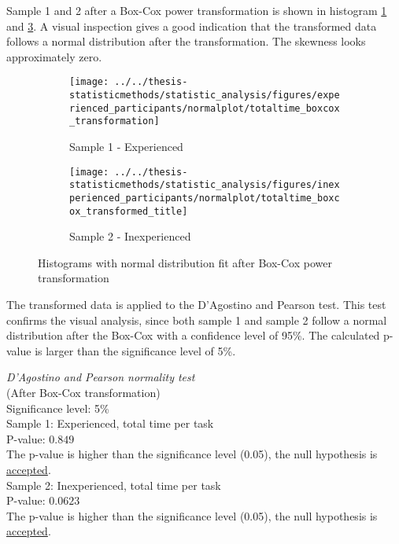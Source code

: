 Sample 1 and 2 after a Box-Cox power transformation is shown in histogram \ref{fig:totaltimeboxcoxtransformation_experienced} and \ref{fig:totaltimeboxcoxtransformedtitle_inexperienced}. A visual inspection gives a good indication that the transformed data follows a normal distribution after the transformation. The skewness looks approximately zero.

\begin{figure}[H]
	\centering
	\begin{subfigure}[b]{0.48\textwidth}
		\centering
		\texttt{[image: ../../thesis-statisticmethods/statistic\_analysis/figures/experienced\_participants/normalplot/totaltime\_boxcox\_transformation]}
		\caption[Experienced, Box-Cox]{Sample 1 - Experienced}
		\label{fig:totaltimeboxcoxtransformation_experienced}
	\end{subfigure}
	\begin{subfigure}[b]{0.48\textwidth}
		\centering
		\texttt{[image: ../../thesis-statisticmethods/statistic\_analysis/figures/inexperienced\_participants/normalplot/totaltime\_boxcox\_transformed\_title]}
		\caption[Inexperienced, Box-Cox]{Sample 2 - Inexperienced}
		\label{fig:totaltimeboxcoxtransformedtitle_inexperienced}
	\end{subfigure}
\caption{Histograms with normal distribution fit after Box-Cox power transformation}
\end{figure}

The transformed data is applied to the D'Agostino and Pearson test. This test confirms the visual analysis, since both sample 1 and sample 2 follow a normal distribution after the Box-Cox with a confidence level of 95\%. The calculated p-value is larger than the significance level of 5\%. \\[0.3cm] 

\begin{center}
	\begin{tcolorbox}[width=0.8\textwidth]
		\centering
		\textit{D'Agostino and Pearson normality test}\\
		(After Box-Cox transformation) \\
		Significance level: 5\%  \\[0.5cm]
		
		Sample 1: Experienced, total time per task\\
		P-value: $0.849$\\
		The p-value is higher than the significance level (0.05), the null hypothesis is \underline{accepted}. \\[0.5cm]
		
		Sample 2: Inexperienced, total time per task \\ %
		P-value: $0.0623$ \\
		The p-value is higher than the significance level (0.05), the null hypothesis is \underline{accepted}. \\[0.5cm]
	\end{tcolorbox}
\end{center}

